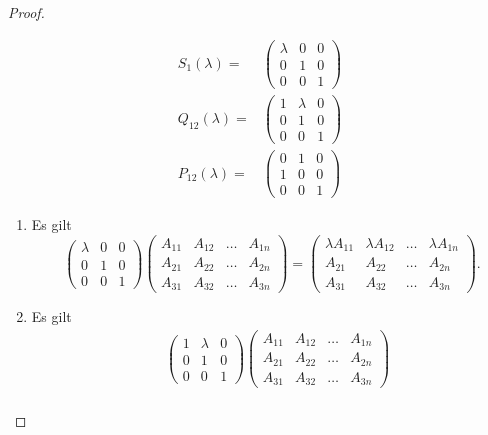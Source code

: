 \begin{proof}
	\begin{parts}
	\item 
		\begin{align*}
			S_1(\lambda)=& \begin{pmatrix} \lambda & 0 & 0 \\ 0 & 1 & 0 \\ 0 & 0 & 1 \end{pmatrix} 	\\
			Q_{12}(\lambda)=&\begin{pmatrix} 1 & \lambda & 0 \\ 0 & 1 & 0 \\ 0 & 0 & 1 \end{pmatrix} \\
			P_{12}(\lambda)=& \begin{pmatrix} 0 & 1 & 0 \\ 1 & 0 & 0 \\ 0 & 0 & 1 \end{pmatrix} 
		\end{align*}
		\begin{enumerate}[label=(\arabic*)]
			\item Es gilt
		\[
			\begin{pmatrix} \lambda & 0 & 0 \\ 0 & 1 & 0 \\ 0 & 0 & 1 \end{pmatrix} \begin{pmatrix} A_{11} & A_{12} & \dots & A_{1n} \\ A_{21} & A_{22} & \dots & A_{2n} \\ A_{31} & A_{32} & \dots & A_{3n} \end{pmatrix}=\begin{pmatrix} \lambda A_{11} & \lambda A_{12} & \dots & \lambda A_{1n} \\ A_{21} & A_{22} & \dots & A_{2n} \\ A_{31} & A_{32} & \dots & A_{3n}\end{pmatrix} 
		.\] 			
	\item Es gilt
		\begin{align*}
			&\begin{pmatrix} 1 & \lambda & 0 \\ 0 & 1 & 0 \\ 0 & 0 & 1 \end{pmatrix}\begin{pmatrix} A_{11} & A_{12} & \dots & A_{1n} \\ A_{21} & A_{22} & \dots & A_{2n} \\ A_{31} & A_{32} & \dots & A_{3n} \end{pmatrix}\\

\end{align*}
\end{enumerate}
\end{parts}
\end{proof}
